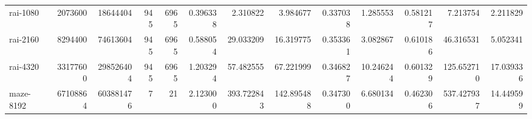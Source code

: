 \begin{tabular}{lrrrrrrrrrrrr}
rai-1080  &   2073600 &     18644404 &        945 &            6965 &    0.396338 &            2.310822 &      3.984677 &     0.337038 &           1.285553 &          0.581217 &    7.213754 &   2.211829 \\
rai-2160  &   8294400 &     74613604 &        945 &            6965 &    0.588054 &           29.033209 &     16.319775 &     0.353361 &           3.082867 &          0.610186 &   46.316531 &   5.052341 \\
rai-4320  &  33177600 &    298526404 &        945 &            6965 &    1.203294 &           57.482555 &     67.221999 &     0.346827 &          10.246244 &          0.601329 &  125.652710 &  17.039336 \\
maze-8192 &  67108864 &    603881476 &          7 &              21 &    2.123000 &          393.722843 &    142.895488 &     0.347300 &           6.680134 &          0.462306 &  537.427937 &  14.449599 \\
\bottomrule
\end{tabular}

